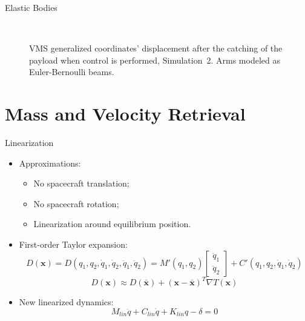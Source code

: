 \begin{frame}{Elastic Bodies}
  \begin{figure}
      \centering
      \subfloat
      {} \quad
    \subfloat
      {} \quad
      \subfloat
      {} \\
      \subfloat
      {} \quad
      \subfloat
      {} \quad
      \subfloat
      {} 
      \caption{VMS generalized coordinates’ displacement after the catching of the payload when control is performed, Simulation~2. Arms modeled as Euler-Bernoulli beams.}
    \end{figure}
\end{frame}

\section{Mass and Velocity Retrieval}

\begin{frame}{Linearization}
  \begin{itemize}
    \item Approximations:
    \begin{itemize}
      \item No spacecraft translation;
      \item No spacecraft rotation;
      \item Linearization around equilibrium position.
    \end{itemize}
    \item First-order Taylor expansion:
    \begin{equation}
      D(\textbf{x})=D(q_1,q_2,\dot{q}_1,\dot{q}_2,\ddot{q}_1,\ddot{q}_2)=M'(q_1,q_2)\begin{bmatrix}
        \ddot{q}_1\\
        \ddot{q}_2
      \end{bmatrix}+C'(q_1,q_2,\dot{q}_1,\dot{q}_2)
    \end{equation}
    \begin{equation}
      D(\textbf{x})\approx D(\bar{\textbf{x}})+(\textbf{x}-\bar{\textbf{x}})^T\nabla T(\textbf{x})
    \end{equation}
    \item New linearized dynamics:
    \begin{equation}
      M_{lin}\ddot{q}+C_{lin}\dot{q}+K_{lin}q-\delta=0
    \end{equation}
  \end{itemize}
\end{frame}

